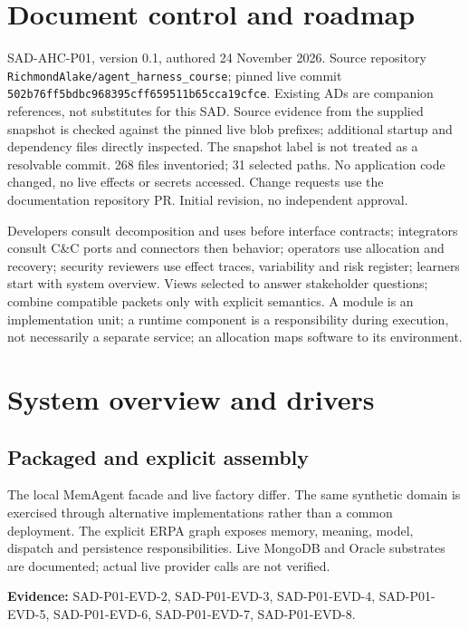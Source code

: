 \documentclass[10pt,letterpaper]{article}
\begin{document}
\makedoctitle
\tableofcontents
\listoffigures
\listoftables
\clearpage
\section{Document control and roadmap}
SAD-AHC-P01, version 0.1, authored 24 November 2026. Source repository \nolinkurl{RichmondAlake/agent_harness_course}; pinned live commit \nolinkurl{502b76ff5bdbc968395cff659511b65cca19cfce}. Existing ADs are companion references, not substitutes for this SAD. Source evidence from the supplied snapshot is checked against the pinned live blob prefixes; additional startup and dependency files directly inspected. The snapshot label is not treated as a resolvable commit. 268 files inventoried; 31 selected paths. No application code changed, no live effects or secrets accessed. Change requests use the documentation repository PR. Initial revision, no independent approval.
\par Developers consult decomposition and uses before interface contracts; integrators consult C\&C ports and connectors then behavior; operators use allocation and recovery; security reviewers use effect traces, variability and risk register; learners start with system overview. Views selected to answer stakeholder questions; combine compatible packets only with explicit semantics. A module is an implementation unit; a runtime component is a responsibility during execution, not necessarily a separate service; an allocation maps software to its environment.
\section{System overview and drivers}
\subsection{Packaged and explicit assembly}
The local MemAgent facade and live factory differ. The same synthetic domain is exercised through alternative implementations rather than a common deployment. The explicit ERPA graph exposes memory, meaning, model, dispatch and persistence responsibilities. Live MongoDB and Oracle substrates are documented; actual live provider calls are not verified.\par\textbf{Evidence:} SAD-P01-EVD-2, SAD-P01-EVD-3, SAD-P01-EVD-4, SAD-P01-EVD-5, SAD-P01-EVD-6, SAD-P01-EVD-7, SAD-P01-EVD-8.\par
\end{document}
